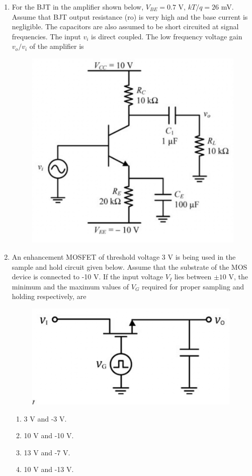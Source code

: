 \documentclass[a4paper, 11pt]{article}
\begin{document}
\begin{enumerate}
    \hfill{}

    \item For the BJT in the amplifier shown below, $V_{BE} = 0.7$ V, $kT/q = 26$ mV. Assume that BJT output resistance (ro) is very high and the base current is negligible. The capacitors are also assumed to be short circuited at signal frequencies. The input $v_i$ is direct coupled. The low frequency voltage gain $v_o/v_i$ of the amplifier is
    \begin{figure}[H]
        \centering
        \includegraphics[width=0.4\columnwidth]{figs/Q35.png}
        \caption*{}
        \label{fig:q45}
    \end{figure}
    \begin{enumerate}
    \end{enumerate}

    \hfill{}

    \item An enhancement MOSFET of threshold voltage 3 V is being used in the sample and hold circuit given below. Assume that the substrate of the MOS device is connected to -10 V. If the input voltage $V_I$ lies between $\pm 10$ V, the minimum and the maximum values of $V_G$ required for proper sampling and holding respectively, are
    \begin{figure}[H]
        \centering
        \includegraphics[width=0.4\columnwidth]{figs/Q36.png}
        \caption*{}
        \label{fig:q46}
    \end{figure}
    \begin{enumerate}
        \item 3 V and -3 V.
        \item 10 V and -10 V.
        \item 13 V and -7 V.
        \item 10 V and -13 V.
    \end{enumerate}


\end{enumerate}
\end{document}
